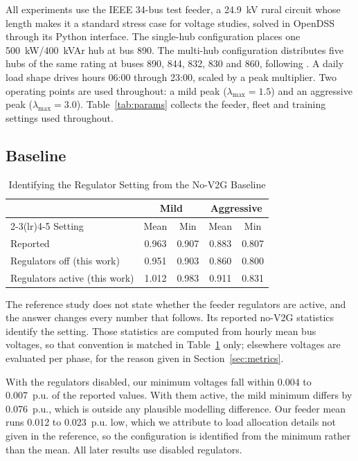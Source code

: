 \documentclass[conference,a4paper]{IEEEtran}
\begin{document}
All experiments use the IEEE 34-bus test feeder, a 24.9~kV rural circuit whose length makes
it a standard stress case for voltage studies, solved in OpenDSS through its Python
interface. The single-hub configuration places one 500~kW/400~kVAr hub at bus 890. The
multi-hub configuration distributes five hubs of the same rating at buses 890, 844, 832, 830
and 860, following \cite{wang2026v2g}. A daily load shape drives hours 06:00 through 23:00,
scaled by a peak multiplier. Two operating points are used throughout: a mild peak
($\lambda_{\max}=1.5$) and an aggressive peak ($\lambda_{\max}=3.0$).
Table~\ref{tab:params} collects the feeder, fleet and training settings used throughout.

\subsection{Baseline}
\label{sec:repro}

\begin{table}[t]
\caption{Identifying the Regulator Setting from the No-V2G Baseline}
\label{tab:repro}
\centering
\begin{tabular}{lcccc}
\toprule
 & \multicolumn{2}{c}{Mild} & \multicolumn{2}{c}{Aggressive} \\
\cmidrule(lr){2-3}\cmidrule(lr){4-5}
Setting & Mean & Min & Mean & Min \\
\midrule
Reported \cite{wang2026v2g} & 0.963 & 0.907 & 0.883 & 0.807 \\
Regulators off (this work)  & 0.951 & 0.903 & 0.860 & 0.800 \\
Regulators active (this work) & 1.012 & 0.983 & 0.911 & 0.831 \\
\bottomrule
\end{tabular}
\end{table}

The reference study does not state whether the feeder regulators are active, and the answer
changes every number that follows. Its reported no-V2G statistics identify the setting.
Those statistics are computed from hourly mean bus voltages, so that convention is matched
in Table~\ref{tab:repro} only; elsewhere voltages are evaluated per phase, for the reason
given in Section~\ref{sec:metrics}.

With the regulators disabled, our minimum voltages fall within 0.004 to 0.007~p.u. of the
reported values. With them active, the mild minimum differs by 0.076~p.u., which is outside
any plausible modelling difference. Our feeder mean runs 0.012 to 0.023~p.u. low, which we
attribute to load allocation details not given in the reference, so the configuration is
identified from the minimum rather than the mean. All later results use disabled regulators.
\end{document}
